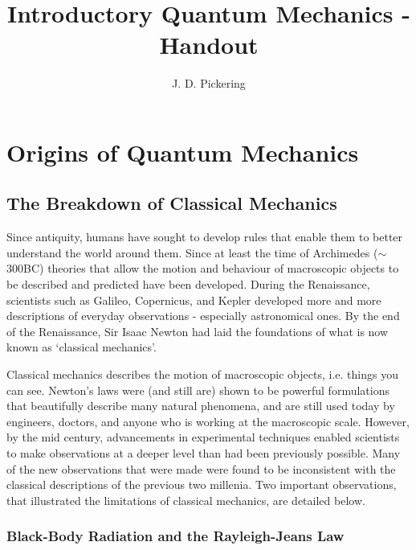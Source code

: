 \documentclass{memoir}[11pt,oneside,a4paper,openany]
\title{Introductory Quantum Mechanics - Handout}
\author{J. D. Pickering}
\begin{document}
\begin{titlingpage}
\maketitle
\end{titlingpage}
\tableofcontents
\chapter{Origins of Quantum Mechanics}

\section{The Breakdown of Classical Mechanics}
Since antiquity, humans have sought to develop rules that enable them to better understand the world around them. Since at least the time of Archimedes ($\sim$300BC) theories that allow the motion and behaviour of macroscopic objects to be described and predicted have been developed. During the Renaissance, scientists such as Galileo, Copernicus, and Kepler developed more and more descriptions of everyday observations - especially astronomical ones. By the end of the Renaissance, Sir Isaac Newton had laid the foundations of what is now known as `classical mechanics'. 

Classical mechanics describes the motion of macroscopic objects, i.e. things you can see. Newton's laws were (and still are) shown to be powerful formulations that beautifully describe many natural phenomena, and are still used today by engineers, doctors, and anyone who is working at the macroscopic scale. However, by the mid  century, advancements in experimental techniques enabled scientists to make observations at a deeper level than had been previously possible. Many of the new observations that were made were found to be inconsistent with the classical descriptions of the previous two millenia. Two important observations, that illustrated the limitations of classical mechanics, are detailed below.

\subsection{Black-Body Radiation and the Rayleigh-Jeans Law}
\end{document}
